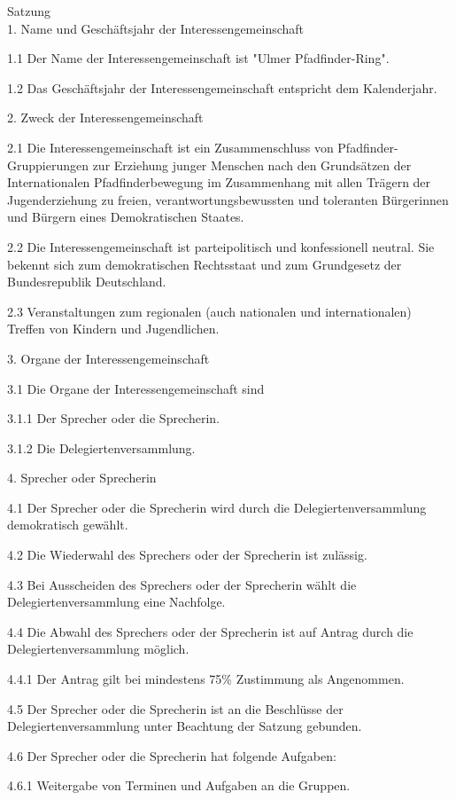 Satzung
\\

1. Name und Geschäftsjahr der Interessengemeinschaft

1.1 Der Name der Interessengemeinschaft ist "Ulmer Pfadfinder-Ring".

1.2 Das Geschäftsjahr der Interessengemeinschaft entspricht dem Kalenderjahr.

2. Zweck der Interessengemeinschaft

2.1 Die Interessengemeinschaft ist ein Zusammenschluss von Pfadfinder-Gruppierungen zur Erziehung junger Menschen nach den Grundsätzen der Internationalen Pfadfinderbewegung im Zusammenhang mit allen Trägern der Jugenderziehung zu freien, verantwortungsbewussten und toleranten Bürgerinnen und Bürgern eines Demokratischen Staates.

2.2 Die Interessengemeinschaft ist parteipolitisch und konfessionell neutral. Sie bekennt sich zum demokratischen Rechtsstaat und zum Grundgesetz der Bundesrepublik Deutschland.

2.3 Veranstaltungen zum regionalen (auch nationalen und internationalen) Treffen von Kindern und Jugendlichen.

3. Organe der Interessengemeinschaft

3.1 Die Organe der Interessengemeinschaft sind

3.1.1 Der Sprecher oder die Sprecherin.

3.1.2 Die Delegiertenversammlung.

4. Sprecher oder Sprecherin

4.1 Der Sprecher oder die Sprecherin wird durch die Delegiertenversammlung demokratisch gewählt.

4.2 Die Wiederwahl des Sprechers oder der Sprecherin ist zulässig.

4.3 Bei Ausscheiden des Sprechers oder der Sprecherin wählt die Delegiertenversammlung eine Nachfolge.

4.4 Die Abwahl des Sprechers oder der Sprecherin ist auf Antrag durch die Delegiertenversammlung möglich.

4.4.1 Der Antrag gilt bei mindestens 75\% Zustimmung als Angenommen.

4.5 Der Sprecher oder die Sprecherin ist an die Beschlüsse der Delegiertenversammlung unter Beachtung der Satzung gebunden.

4.6 Der Sprecher oder die Sprecherin hat folgende Aufgaben:

4.6.1 Weitergabe von Terminen und Aufgaben an die Gruppen.

